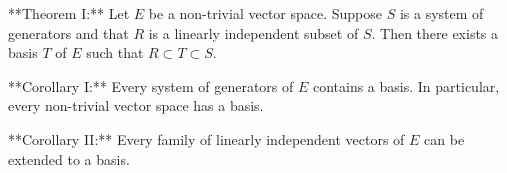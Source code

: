 **Theorem I:** Let $E$ be a non-trivial vector space. Suppose $S$ is a system of generators and that $R$ is a linearly independent subset of $S$. Then there exists a basis $T$ of $E$ such that $R \subset T \subset S$.

**Corollary I:** Every system of generators of $E$ contains a basis. In particular, every non-trivial vector space has a basis.

**Corollary II:** Every family of linearly independent vectors of $E$ can be extended to a basis.
